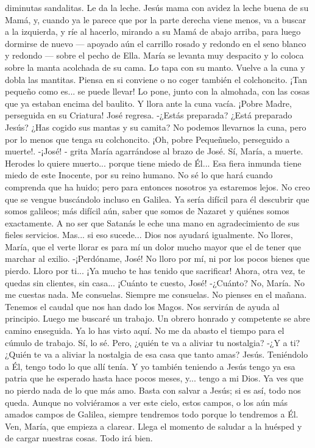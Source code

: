 \documentclass[12pt]{book} %
\begin{document}
diminutas sandalitas. Le da la leche. Jesús mama con avidez la leche buena de su Mamá, y, cuando ya le parece que por la parte derecha viene menos, va a buscar a la izquierda, y ríe al hacerlo, mirando a su Mamá de abajo arriba, para luego dormirse de nuevo — apoyado aún el carrillo rosado y redondo en el seno blanco y redondo — sobre el pecho de Ella. 
María se levanta muy despacito y lo coloca sobre la manta acolchada de su cama. Lo tapa con su manto. Vuelve a la 
cuna y dobla  las mantitas. Piensa en si conviene o no coger también el colchoncito. ¡Tan pequeño como es... se puede llevar! Lo pone, junto con la almohada, con las cosas que ya estaban encima del baulito. Y llora ante la cuna vacía. ¡Pobre Madre, perseguida en su Criatura! 
José regresa. 
-¿Estás preparada? ¿Está preparado Jesús? ¿Has cogido sus mantas y su camita? No podemos llevarnos la cuna, pero 
por lo menos que tenga su colchoncito. ¡Oh, pobre Pequeñuelo, perseguido a muerte!. 
-¡José! - grita María agarrándose al brazo de José. 
Sí, María, a muerte. Herodes lo quiere muerto... porque tiene miedo de Él... Esa fiera inmunda tiene miedo de este Inocente, por su reino humano. No sé lo que hará cuando comprenda que ha huido; pero para entonces nosotros ya estaremos lejos. No creo que se vengue buscándolo incluso en Galilea. Ya sería difícil para él descubrir que somos galileos; más difícil aún, saber que somos de Nazaret y quiénes somos exactamente. A no ser que Satanás le eche una mano en agradecimiento de sus fieles servicios. Mas... si eso sucede... Dios nos ayudará igualmente. No llores, María, que el verte llorar es para mí un dolor mucho mayor que el de tener que marchar al exilio. 
-¡Perdóname, José! No lloro por mí, ni por los pocos bienes que pierdo. Lloro por ti... ¡Ya mucho te has tenido que 
sacrificar! Ahora, otra vez, te quedas sin clientes, sin casa... ¡Cuánto te cuesto, José! 
-¿Cuánto? No, María. No me cuestas nada. Me consuelas. Siempre me consuelas. No pienses en el mañana. Tenemos el 
caudal que nos han dado los Magos. Nos servirán de ayuda al principio. Luego me buscaré un trabajo. Un obrero honrado y competente se abre camino enseguida. Ya lo has visto aquí. No me da abasto el tiempo para el cúmulo de trabajo. 
Sí, lo sé. Pero, ¿quién te va a aliviar tu nostalgia? 
-¿Y a ti? ¿Quién te va a aliviar la nostalgia de esa casa que tanto amas? 
Jesús. Teniéndolo a Él, tengo todo lo que allí tenía. 
Y yo también teniendo a Jesús tengo ya esa patria que he esperado hasta hace pocos meses, y... tengo a mi Dios. Ya 
ves que no pierdo nada de lo que más amo. Basta con salvar a Jesús; si es así, todo nos queda. Aunque no volviéramos a ver este cielo, estos campos, o los aún más amados campos de Galilea, siempre tendremos todo porque lo tendremos a Él. Ven, María, que empieza a clarear. Llega el momento de saludar a la huésped y de cargar nuestras cosas. Todo irá bien.         
\end{document}
